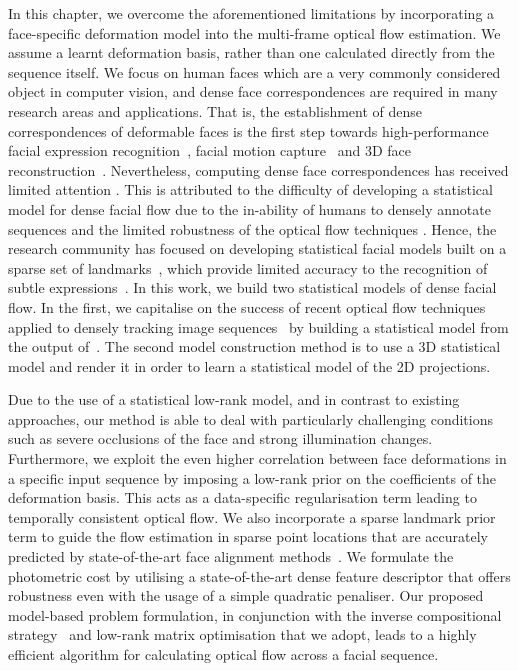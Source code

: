 In this chapter, we overcome the aforementioned limitations by incorporating a face-specific 
deformation model into the multi-frame optical flow estimation. We assume a learnt 
deformation basis, rather than one calculated directly from the sequence itself. We 
focus on human faces which are a very commonly considered object in computer vision, 
and dense face correspondences are required in many research areas and applications. 
That is, the establishment of dense correspondences of deformable faces is the first step 
towards high-performance facial expression recognition~\cite{koelstra2010dynamic},
facial motion capture~\cite{Beeler:2011ey} and 3D face reconstruction~\cite{garg2013dense}. 
Nevertheless, computing dense face correspondences has received limited attention 
\cite{decarlo2000optical,yacoob1996recognizing}. This is attributed to the difficulty of 
developing a statistical model for dense facial flow due to the in-ability of humans to 
densely annotate sequences and the limited robustness of the optical flow techniques 
\cite{decarlo2000optical}. Hence, the research community has focused on developing 
statistical facial models built on a sparse set of landmarks~\cite{xiong2013supervised}, 
which provide limited accuracy to the recognition of subtle expressions~\cite{li2013spontaneous}. 
In this work, we build two statistical models of dense facial flow. In the first,
we capitalise on the success of recent optical flow techniques applied to
densely tracking image sequences~\cite{garg2013variational} by building a
statistical model from the output of~\cite{garg2013variational}. The second
model construction method is to use a 3D statistical model and render it in
order to learn a statistical model of the 2D projections.

Due to the use of a statistical low-rank model, and in contrast to existing 
approaches, our method is able to deal with 
particularly challenging conditions such as severe occlusions of the face and strong 
illumination changes. Furthermore, we exploit the even higher correlation 
between face deformations in 
a specific input sequence by imposing a low-rank prior on the coefficients of the 
deformation basis. This acts as a data-specific regularisation term leading to 
temporally consistent optical flow.
We also incorporate a sparse landmark prior term to guide the flow estimation in
sparse point locations that are accurately predicted by state-of-the-art face 
alignment methods~\cite{kazemi2014one}.
We formulate the photometric cost by utilising a state-of-the-art dense 
feature descriptor that offers robustness even with the usage of a simple
quadratic penaliser.
Our proposed model-based problem formulation, in conjunction with the inverse 
compositional strategy~\cite{baker2004lucas} and low-rank matrix optimisation
that we adopt, leads to a highly efficient algorithm for calculating optical
flow across a facial sequence.
